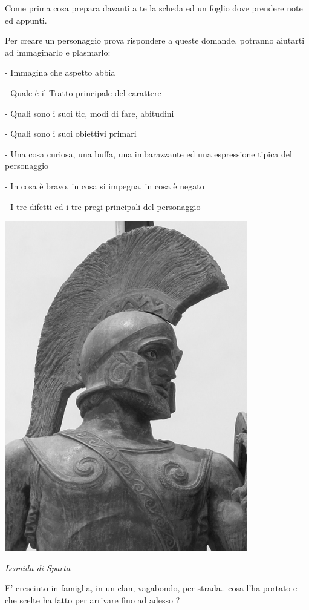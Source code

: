 \begin{multicols}{2}

Come prima cosa prepara davanti a te la scheda ed un foglio dove prendere note ed appunti.

Per creare un personaggio prova rispondere a queste domande, potranno aiutarti ad immaginarlo e plasmarlo:

- Immagina che aspetto abbia

- Quale è il Tratto principale del carattere

- Quali sono i suoi tic, modi di fare, abitudini

- Quali sono i suoi obiettivi primari

- Una cosa curiosa, una buffa, una imbarazzante ed una espressione tipica del personaggio

- In cosa è bravo, in cosa si impegna, in cosa è negato

- I tre difetti ed i tre pregi principali del personaggio

\begin{center}

 \includegraphics[width=0.7\linewidth]{immagini/Leonidas_I_of_Sparta.png}

\emph{Leonida di Sparta}
\end{center}

E' cresciuto in famiglia, in un clan, vagabondo, per strada.. cosa l'ha portato e che scelte ha fatto per arrivare fino ad adesso ?


\end{multicols}
